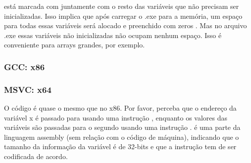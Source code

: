  está marcada com  juntamente com o resto das variáveis que não precisam ser inicializadas.
Isso implica que após carregar o .exe para a memória, um espaço para todas essas variáveis será alocado e preenchido com zeros .
Mas no arquivo .exe essas variáveis não inicializadas não ocupam nenhum espaço.
Isso é conveniente para arrays grandes, por exemplo.



\subsubsection{GCC: x86}

\PTBRph{}

\subsubsection{MSVC: x64}



O código é quase o mesmo que no x86.
Por favor, perceba que o endereço da variável x é passado para  usando uma instrução \LEA,
enquanto os valores das variáveis são passadas para o segundo \printf usando uma instrução \MOV.
 é uma parte da linguagem assembly (sem relação com o código de máquina),
indicando que o tamanho da informação da variável é de 32-bits e que a instrução \MOV tem de ser codificada de acordo.

